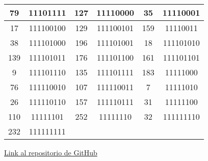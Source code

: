 \documentclass[conference,onecolumn,12pt]{IEEEtran}
\numberwithin{equation}{subsection}
\begin{document}
\begin{table}[h]
\begin{tabular}{cccccc}
79 & 11101111 & 127 & 11110000 & 35 & 11110001 \\ \hline
17 & 111100100 & 129 & 111100101 & 159 & 11110011 \\ \hline
38 & 111101000 & 196 & 111101001 & 18 & 111101010 \\ \hline
139 & 111101011 & 176 & 111101100 & 161 & 111101101 \\ \hline
9 & 111101110 & 135 & 111101111 & 183 & 11111000 \\ \hline
76 & 111110010 & 107 & 111110011 & 7 & 11111010 \\ \hline
26 & 111110110 & 157 & 111110111 & 31 & 11111100 \\ \hline
110 & 11111101 & 252 & 11111110 & 32 & 111111110 \\ \hline
232 & 111111111 &  &  &  &  \\ \hline
\end{tabular}
\end{table}







\href{https://github.com/NagelMS/Tarea2_CE2.git}{Link al repositorio de GitHub}
\end{document}
